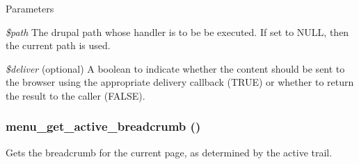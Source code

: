\begin{DoxyParams}{Parameters}
\item[{\em \$path}]The drupal path whose handler is to be be executed. If set to NULL, then the current path is used. \item[{\em \$deliver}](optional) A boolean to indicate whether the content should be sent to the browser using the appropriate delivery callback (TRUE) or whether to return the result to the caller (FALSE). \end{DoxyParams}
\hypertarget{group__menu_ga009731c4b3e736ebb620ba90e7f04207}{
\subsubsection[{menu\_\-get\_\-active\_\-breadcrumb}]{\setlength{\rightskip}{0pt plus 5cm}menu\_\-get\_\-active\_\-breadcrumb ()}}
\label{group__menu_ga009731c4b3e736ebb620ba90e7f04207}
Gets the breadcrumb for the current page, as determined by the active trail.

